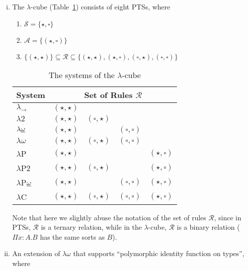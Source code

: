 \documentclass[oneside,a4paper]{article}
\numberwithin{equation}{section}
\begin{document}
\begin{enumerate}[(i)]

\item The $\lambda$-cube (Table~\ref{tab:lambda}) consists of eight
  PTSs, where

  \begin{enumerate}
  \item $\mathcal{S} = \{\star,\square\}$
  \item $\mathcal{A} = \{(\star, \square)\}$
  \item
    $\{(\star, \star)\} \subseteq \mathcal{R} \subseteq \{(\star,
    \star), (\star, \square), (\square, \star), (\square, \square)\}$
  \end{enumerate}


\begin{table}[h!]
  \centering
  \begin{tabular}{|l|llll|}
    \hline
    System & \multicolumn{4}{|c|}{Set of Rules $\mathcal{R}$} \\ \hline
    $\lambda_{\rightarrow}$ & $(\star, \star)$ & & & \\
    $\lambda2$ & $(\star, \star)$ & $(\square, \star)$ & & \\ 
    $\lambda\underbar{$\omega$}$ & $(\star, \star)$ & &  $(\square, \square)$ & \\ 
    $\lambda\omega$ & $(\star, \star)$ & $(\square, \star)$ & $(\square, \square)$ & \\ 
    $\lambda$P & $(\star, \star)$ & & & $(\star, \square)$ \\ 
    $\lambda$P2 & $(\star, \star)$ & $(\square, \star)$ & & $(\star, \square)$ \\ 
    $\lambda$P$\underbar{$\omega$}$ & $(\star, \star)$ & & $(\square, \square)$ & $(\star, \square)$ \\ 
    $\lambda$C & $(\star, \star)$ & $(\square, \star)$ & $(\square, \square)$ & $(\star, \square)$ \\ \hline
  \end{tabular}
  \caption{The systems of the $\lambda$-cube}
  \label{tab:lambda}
\end{table}

Note that here we slightly abuse the notation of the set of rules
$\mathcal{R}$, since in PTSs, $\mathcal{R}$ is a ternary relation,
while in the $\lambda$-cube, $\mathcal{R}$ is a binary relation
($\Pi x: A.B$ has the same sorts as $B$).


\item An extension of $\lambda\omega$ that supports ``polymorphic
  identity function on types'', where


\end{enumerate}
\end{document}
